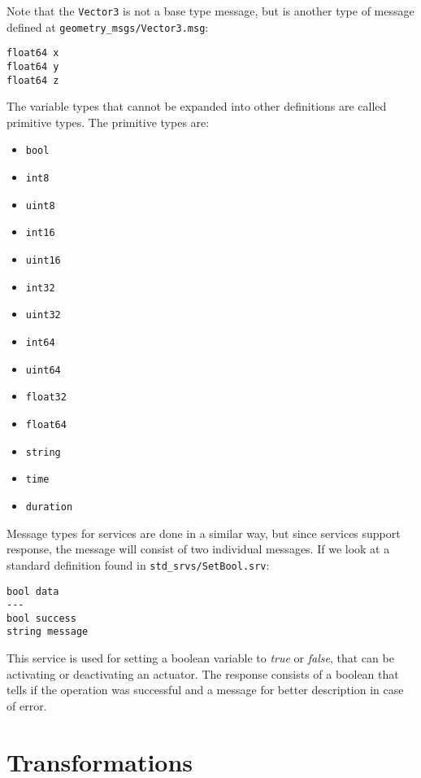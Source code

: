 Note that the \texttt{Vector3} is not a base type message, but is another type of message defined at \texttt{geometry\_msgs/Vector3.msg}:

\begin{lstlisting}
float64 x
float64 y
float64 z
\end{lstlisting}

The variable types that cannot be expanded into other definitions are called primitive types. The primitive types are:

\begin{multicols}{3}
    \begin{itemize}
        \item \texttt{bool}
        \item \texttt{int8}
        \item \texttt{uint8}
        \item \texttt{int16}
        \item \texttt{uint16}
        \item \texttt{int32}
        \item \texttt{uint32}
        \item \texttt{int64}
        \item \texttt{uint64}
        \item \texttt{float32}
        \item \texttt{float64}
        \item \texttt{string}
        \item \texttt{time}
        \item \texttt{duration}
    \end{itemize}
\end{multicols}

Message types for services are done in a similar way, but since services support response, the message will consist of two individual messages. If we look at a standard definition found in \texttt{std\_srvs/SetBool.srv}:

\begin{lstlisting}
bool data
---
bool success
string message
\end{lstlisting}

This service is used for setting a boolean variable to \textit{true} or \textit{false}, that can be activating or deactivating an actuator. The response consists of a boolean that tells if the operation was successful and a message for better description in case of error.

\section{Transformations}

